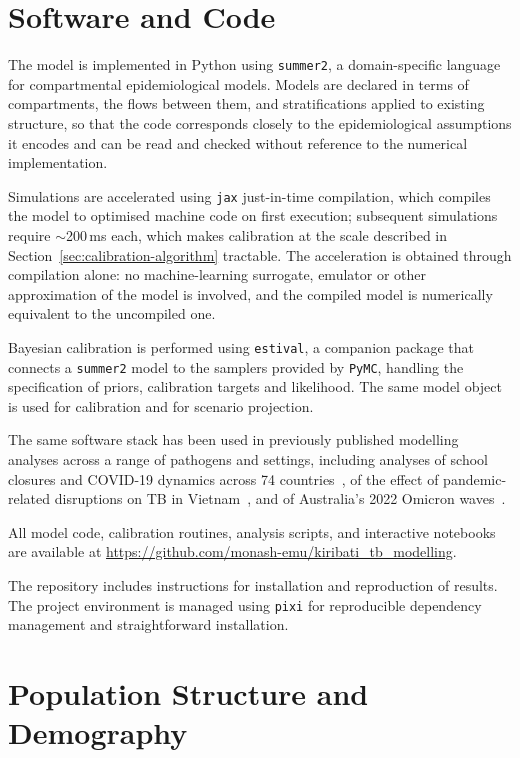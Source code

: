 \documentclass[11pt]{article}
\begin{document}
\section{Software and Code}

The model is implemented in Python using \texttt{summer2}, a domain-specific language for compartmental epidemiological models. Models are declared in terms of compartments, the flows between them, and stratifications applied to existing structure, so that the code corresponds closely to the epidemiological assumptions it encodes and can be read and checked without reference to the numerical implementation.

Simulations are accelerated using \texttt{jax} just-in-time compilation, which compiles the model to optimised machine code on first execution; subsequent simulations require \(\sim\)200\,ms each, which makes calibration at the scale described in Section~\ref{sec:calibration-algorithm} tractable. The acceleration is obtained through compilation alone: no machine-learning surrogate, emulator or other approximation of the model is involved, and the compiled model is numerically equivalent to the uncompiled one.

Bayesian calibration is performed using \texttt{estival}, a companion package that connects a \texttt{summer2} model to the samplers provided by \texttt{PyMC}, handling the specification of priors, calibration targets and likelihood. The same model object is used for calibration and for scenario projection.

The same software stack has been used in previously published modelling analyses across a range of pathogens and settings, including analyses of school closures and COVID-19 dynamics across 74 countries~\cite{ragonnet2025}, of the effect of pandemic-related disruptions on TB in Vietnam~\cite{bui2025}, and of Australia's 2022 Omicron waves~\cite{trauer2025}.

All model code, calibration routines, analysis scripts, and interactive notebooks are available at \url{https://github.com/monash-emu/kiribati_tb_modelling}.

The repository includes instructions for installation and reproduction of results. The project environment is managed using \texttt{pixi} for reproducible dependency management and straightforward installation.

\section{Population Structure and Demography}
\label{sec:demog}
\end{document}
